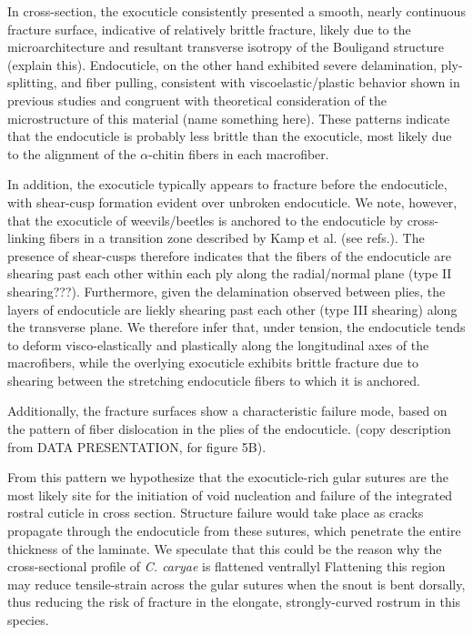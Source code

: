 \documentclass[twocolumn, linenumbers, superscriptaddress]{revtex4-1}
\begin{document}
			In cross-section, the exocuticle consistently presented a smooth, nearly continuous fracture surface, indicative of relatively brittle fracture, likely due to the microarchitecture and resultant transverse isotropy of the Bouligand structure (explain this).
			Endocuticle, on the other hand exhibited severe delamination, ply-splitting, and fiber pulling, consistent with viscoelastic/plastic behavior shown in previous studies and congruent with theoretical consideration of the microstructure of this material (name something here). 
			These patterns indicate that the endocuticle is probably less brittle than the exocuticle, most likely due to the alignment of the $\alpha$-chitin fibers in each macrofiber.
			
			In addition, the exocuticle typically appears to fracture before the endocuticle, with shear-cusp formation evident over unbroken endocuticle.
			We note, however, that the exocuticle of weevils/beetles is anchored to the endocuticle by cross-linking fibers in a transition zone described by Kamp et al. (see refs.).
			The presence of shear-cusps therefore indicates that the fibers of the endocuticle are shearing past each other within each ply along the radial/normal plane (type II shearing???).
			Furthermore, given the delamination observed between plies, the layers of endocuticle are liekly shearing past each other (type III shearing) along the transverse plane.
			We therefore infer that, under tension, the endocuticle tends to deform visco-elastically and plastically along the longitudinal axes of the macrofibers, while the overlying exocuticle exhibits brittle fracture due to shearing between the stretching endocuticle fibers to which it is anchored.
			
			Additionally, the fracture surfaces show a characteristic failure mode, based on the pattern of fiber dislocation in the plies of the endocuticle.
			(copy description from DATA PRESENTATION, for figure 5B).
			
			From this pattern we hypothesize that the exocuticle-rich gular sutures are the most likely site for the initiation of void nucleation and failure of the integrated rostral cuticle in cross section.
			Structure failure would take place as cracks propagate through the endocuticle from these sutures, which penetrate the entire thickness of the laminate.
			We speculate that this could be the reason why the cross-sectional profile of \textit{C. caryae} is flattened ventrallyl
			Flattening this region may reduce tensile-strain across the gular sutures when the snout is bent dorsally, thus reducing the risk of fracture in the elongate, strongly-curved rostrum in this species.
		
\end{document}
